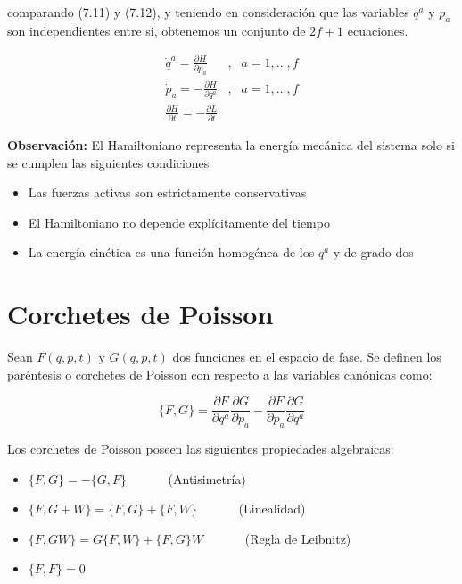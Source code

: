 \documentclass[12pt]{report}
\begin{document}
comparando (7.11) y (7.12), y teniendo en consideración que las variables $q^a$ y $p_a$ son independientes entre si, obtenemos un conjunto de $2f+1$ ecuaciones.

\begin{eqnarray} \nonumber
\dot{q}^a = \frac{\partial H}{\partial p_a}  &,&  a= 1,...,f \\
\dot{p}_a = -\frac{\partial H}{\partial q^a}  &,&  a=1,...,f \\ \nonumber
\frac{\partial H}{\partial t} = - \frac{\partial L}{\partial t}
\end{eqnarray} 


\textbf{Observación:} El Hamiltoniano representa la energía mecánica del sistema solo si se cumplen las siguientes condiciones 

\begin{itemize}
\item Las fuerzas activas son estrictamente conservativas 
\item El Hamiltoniano no depende explícitamente del tiempo
\item La energía cinética es una función homogénea de los $q^a$ y de grado dos
\end{itemize}
















\section{Corchetes de Poisson}

	
Sean $F(q,p,t)$ y $G(q,p,t)$ dos funciones en el espacio de fase. Se definen los paréntesis o corchetes de Poisson con respecto a las variables canónicas como:

\begin{equation}
\{F,G\}=\frac{\partial F}{\partial q^a} \frac{\partial G}{\partial p_a}-\frac{\partial F}{\partial p_a}\frac{\partial G}{\partial q^a}
\end{equation}


Los corchetes de Poisson poseen las siguientes propiedades algebraicas:

\begin{itemize}
\item $\{F,G\} = -\{G,F\}$ \ \ \  \ \ \   (Antisimetría)

\item $\{F,G+W \}= \{F,G\} + \{F,W\}$ \ \ \  \ \ \  (Linealidad)

\item $\{F,GW\}= G\{F,W\} + \{F,G\}W$ \ \ \   \ \ \ (Regla de Leibnitz)

\item $\{ F,F \}= 0$
\end{itemize}
\end{document}
